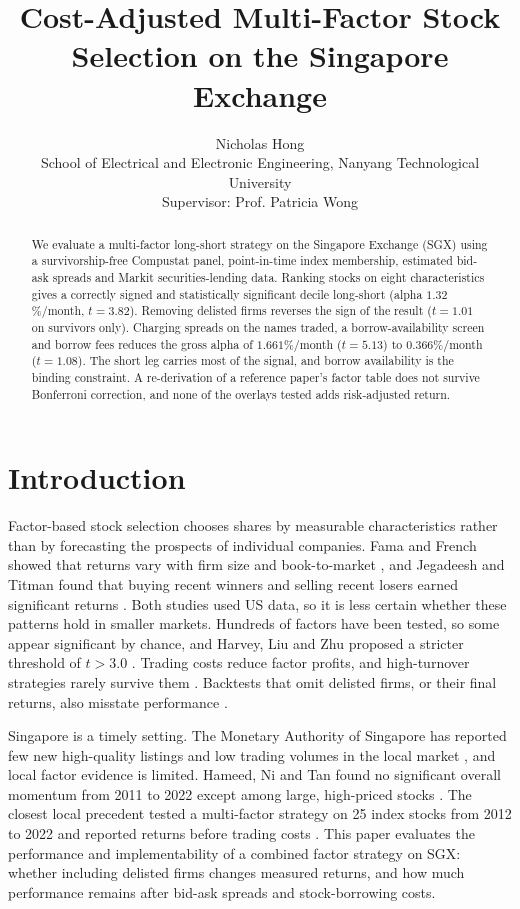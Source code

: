 \documentclass[11pt,a4paper]{article}
\title{Cost-Adjusted Multi-Factor Stock Selection on the Singapore Exchange}
\author{Nicholas Hong\\School of Electrical and Electronic Engineering, Nanyang Technological University\\Supervisor: Prof. Patricia Wong}
\date{}
\begin{document}
\maketitle

\begin{abstract}
We evaluate a multi-factor long-short strategy on the Singapore Exchange (SGX) using a survivorship-free Compustat panel, point-in-time index membership, estimated bid-ask spreads and Markit securities-lending data. Ranking stocks on eight characteristics gives a correctly signed and statistically significant decile long-short (alpha $1.32$\%/month, $t=3.82$). Removing delisted firms reverses the sign of the result ($t=1.01$ on survivors only). Charging spreads on the names traded, a borrow-availability screen and borrow fees reduces the gross alpha of $1.661$\%/month ($t=5.13$) to $0.366$\%/month ($t=1.08$). The short leg carries most of the signal, and borrow availability is the binding constraint. A re-derivation of a reference paper's factor table does not survive Bonferroni correction, and none of the overlays tested adds risk-adjusted return.
\end{abstract}

\section{Introduction}
Factor-based stock selection chooses shares by measurable characteristics rather than by forecasting the prospects of individual companies. Fama and French showed that returns vary with firm size and book-to-market \cite{fama1993}, and Jegadeesh and Titman found that buying recent winners and selling recent losers earned significant returns \cite{jt1993}. Both studies used US data, so it is less certain whether these patterns hold in smaller markets. Hundreds of factors have been tested, so some appear significant by chance, and Harvey, Liu and Zhu proposed a stricter threshold of $t>3.0$ \cite{hlz2016}. Trading costs reduce factor profits, and high-turnover strategies rarely survive them \cite{nmv2016}. Backtests that omit delisted firms, or their final returns, also misstate performance \cite{shumway1997}.

Singapore is a timely setting. The Monetary Authority of Singapore has reported few new high-quality listings and low trading volumes in the local market \cite{mas2025}, and local factor evidence is limited. Hameed, Ni and Tan found no significant overall momentum from 2011 to 2022 except among large, high-priced stocks \cite{hameed2023}. The closest local precedent tested a multi-factor strategy on 25 index stocks from 2012 to 2022 and reported returns before trading costs \cite{cen2023}. This paper evaluates the performance and implementability of a combined factor strategy on SGX: whether including delisted firms changes measured returns, and how much performance remains after bid-ask spreads and stock-borrowing costs.
\end{document}

